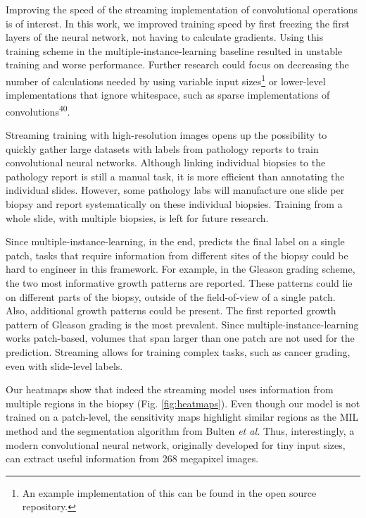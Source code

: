\documentclass[
  12pt,
  a5,margin=2cmpaper,
]{article}
\begin{document}
Improving the speed of the streaming implementation of convolutional
operations is of interest. In this work, we improved training speed by
first freezing the first layers of the neural network, not having to
calculate gradients. Using this training scheme in the
multiple-instance-learning baseline resulted in unstable training and
worse performance. Further research could focus on decreasing the number
of calculations needed by using variable input sizes\footnote{An example
  implementation of this can be found in the open source repository.} or
lower-level implementations that ignore whitespace, such as sparse
implementations of convolutions\textsuperscript{40}.

Streaming training with high-resolution images opens up the possibility
to quickly gather large datasets with labels from pathology reports to
train convolutional neural networks. Although linking individual
biopsies to the pathology report is still a manual task, it is more
efficient than annotating the individual slides. However, some pathology
labs will manufacture one slide per biopsy and report systematically on
these individual biopsies. Training from a whole slide, with multiple
biopsies, is left for future research.

Since multiple-instance-learning, in the end, predicts the final label
on a single patch, tasks that require information from different sites
of the biopsy could be hard to engineer in this framework. For example,
in the Gleason grading scheme, the two most informative growth patterns
are reported. These patterns could lie on different parts of the biopsy,
outside of the field-of-view of a single patch. Also, additional growth
patterns could be present. The first reported growth pattern of Gleason
grading is the most prevalent. Since multiple-instance-learning works
patch-based, volumes that span larger than one patch are not used for
the prediction. Streaming allows for training complex tasks, such as
cancer grading, even with slide-level labels.

Our heatmaps show that indeed the streaming model uses information from
multiple regions in the biopsy (Fig.
\protect\hyperlink{fig:heatmaps}{{[}fig:heatmaps{]}}). Even though our
model is not trained on a patch-level, the sensitivity maps highlight
similar regions as the MIL method and the segmentation algorithm from
Bulten \emph{et al.} Thus, interestingly, a modern convolutional neural
network, originally developed for tiny input sizes, can extract useful
information from 268 megapixel images.
\end{document}
